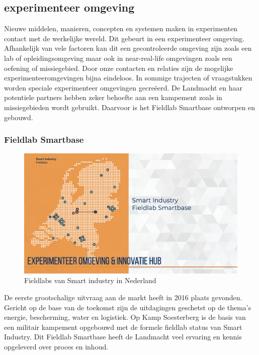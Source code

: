 \documentclass[
]{book}
\begin{document}
\hypertarget{experimenteer-omgeving}{%
\subsection{experimenteer omgeving}\label{experimenteer-omgeving}}

Nieuwe middelen, manieren, concepten en systemen maken in experimenten contact met de werkelijke wereld. Dit gebeurt in een experimenteer omgeving. Afhankelijk van vele factoren kan dit een gecontroleerde omgeving zijn zoals een lab of opleidingsomgeving maar ook in near-real-life omgevingen zoals een oefening of missiegebied. Door onze contacten en relaties zijn de mogelijke experimenteeromgevingen bijna eindeloos. In sommige trajecten of vraagstukken worden speciale experimenteer omgevingen gecreëerd. De Landmacht en haar potentiele partners hebben zeker behoefte aan een kampement zoals in missiegebieden wordt gebruikt. Daarvoor is het Fieldlab Smartbase ontworpen en gebouwd.

\hypertarget{fieldlab-smartbase}{%
\subsubsection{Fieldlab Smartbase}\label{fieldlab-smartbase}}

\begin{figure}

{\centering \includegraphics[width=0.5\linewidth]{data/keynote-slides/20200430-CDE-Designprocess/20200430-CDE-Designprocess.009-6} 

}

\caption{Fieldlabs van Smart industry in Nederland }\label{fig:unnamed-chunk-13}
\end{figure}

De eerste grootschalige uitvraag aan de markt heeft in 2016 plaats gevonden. Gericht op de base van de toekomst zijn de uitdagingen geschetst op de thema's energie, bescherming, water en logistiek. Op Kamp Soesterberg is de basis van een militair kampement opgebouwd met de formele fieldlab status van Smart Industry. Dit Fieldlab Smartbase heeft de Landmacht veel ervaring en kennis opgeleverd over proces en inhoud.
\end{document}
